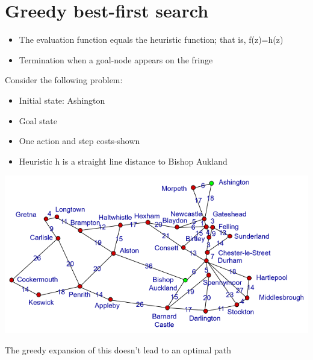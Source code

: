 \documentclass{article}[18pt]
\begin{document}
\section{Greedy best-first search}
\begin{itemize}
	\item The evaluation function equals the heuristic function; that is, f(z)=h(z)
	\item Termination when a goal-node appears on the fringe
\end{itemize}
Consider the following problem:
\begin{itemize}
	\item Initial state: Ashington
	\item Goal state
	\item One action and step costs-shown
	\item Heuristic h is a straight line distance to Bishop Aukland
\end{itemize}
\begin{center}
	\includegraphics[scale=1]{"ashington->bishop aukland"}
\end{center}
The greedy expansion of this doesn't lead to an optimal path
\end{document}
